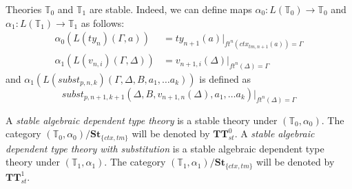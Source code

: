 \documentclass[reqno]{amsart}
\theoremstyle{definition}
\theoremstyle{remark}
\newcommand{\cat}[1]{\mathbf{#1}}
\newcommand{\algtt}{\cat{TT}}
\newcommand{\St}{\cat{St}}
\numberwithin{figure}{section}
\begin{document}
Theories $\mathbb{T}_0$ and $\mathbb{T}_1$ are stable.
Indeed, we can define maps $\alpha_0 : L(\mathbb{T}_0) \to \mathbb{T}_0$ and $\alpha_1 : L(\mathbb{T}_1) \to \mathbb{T}_1$ as follows:
\begin{align*}
\alpha_0(L(ty_n)(\Gamma,a)) & = ty_{n+1}(a)|_{ft^n(ctx_{tm,n+1}(a)) = \Gamma} \\
\alpha_1(L(v_{n,i})(\Gamma,\Delta)) & = v_{n+1,i}(\Delta)|_{ft^n(\Delta) = \Gamma}
\end{align*}
and $\alpha_1(L(subst_{p,n,k})(\Gamma, \Delta, B, a_1, \ldots a_k))$ is defined as
\[ subst_{p,n+1,k+1}(\Delta, B, v_{n+1,n}(\Delta), a_1, \ldots a_k)|_{ft^n(\Delta) = \Gamma} \]

\begin{defn}
A \emph{stable algebraic dependent type theory} is a stable theory under $(\mathbb{T}_0,\alpha_0)$.
The category $(\mathbb{T}_0,\alpha_0)/\St_{\{ctx,tm\}}$ will be denoted by $\algtt^0_{st}$.
A \emph{stable algebraic dependent type theory with substitution} is a stable algebraic dependent type theory under $(\mathbb{T}_1,\alpha_1)$.
The category $(\mathbb{T}_1,\alpha_1)/\St_{\{ctx,tm\}}$ will be denoted by $\algtt^1_{st}$.
\end{defn}
\end{document}
